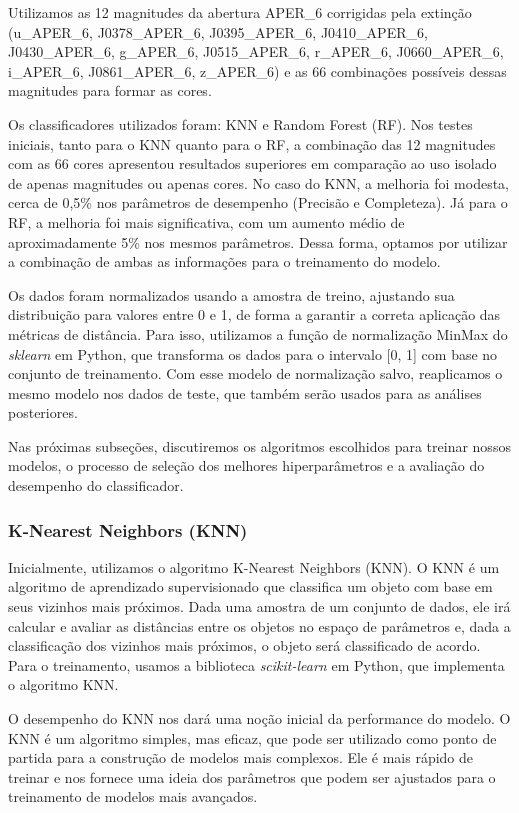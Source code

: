 \raggedright
Utilizamos as 12 magnitudes da abertura APER\_6 corrigidas pela extinção (u\_APER\_6, J0378\_APER\_6, J0395\_APER\_6, J0410\_APER\_6, J0430\_APER\_6, g\_APER\_6, J0515\_APER\_6, r\_APER\_6, J0660\_APER\_6, i\_APER\_6, J0861\_APER\_6, z\_APER\_6) e as 66 combinações possíveis dessas magnitudes para formar as cores.

Os classificadores utilizados foram: \ac{KNN} e Random Forest (RF). Nos testes iniciais, tanto para o \ac{KNN} quanto para o RF, a combinação das 12 magnitudes com as 66 cores apresentou resultados superiores em comparação ao uso isolado de apenas magnitudes ou apenas cores. No caso do KNN, a melhoria foi modesta, cerca de 0,5\% nos parâmetros de desempenho (Precisão e Completeza). Já para o RF, a melhoria foi mais significativa, com um aumento médio de aproximadamente 5\% nos mesmos parâmetros. Dessa forma, optamos por utilizar a combinação de ambas as informações para o treinamento do modelo.

Os dados foram normalizados usando a amostra de treino, ajustando sua distribuição para valores entre 0 e 1, de forma a garantir a correta aplicação das métricas de distância. Para isso, utilizamos a função de normalização MinMax do \textit{sklearn} em Python, que transforma os dados para o intervalo [0, 1] com base no conjunto de treinamento. Com esse modelo de normalização salvo, reaplicamos o mesmo modelo nos dados de teste, que também serão usados para as análises posteriores.

Nas próximas subseções, discutiremos os algoritmos escolhidos para treinar nossos modelos, o processo de seleção dos melhores hiperparâmetros e a avaliação do desempenho do classificador.

\subsubsection*{K-Nearest Neighbors (KNN)}\label{subsubsec:knn}
Inicialmente, utilizamos o algoritmo K-Nearest Neighbors (KNN). O KNN é um algoritmo de aprendizado supervisionado que classifica um objeto com base em seus vizinhos mais próximos. Dada uma amostra de um conjunto de dados, ele irá calcular e avaliar as distâncias entre os objetos no espaço de parâmetros e, dada a classificação dos vizinhos mais próximos, o objeto será classificado de acordo. Para o treinamento, usamos a biblioteca \textit{scikit-learn} em Python, que implementa o algoritmo KNN.

O desempenho do KNN nos dará uma noção inicial da performance do modelo. O KNN é um algoritmo simples, mas eficaz, que pode ser utilizado como ponto de partida para a construção de modelos mais complexos. Ele é mais rápido de treinar e nos fornece uma ideia dos parâmetros que podem ser ajustados para o treinamento de modelos mais avançados.

